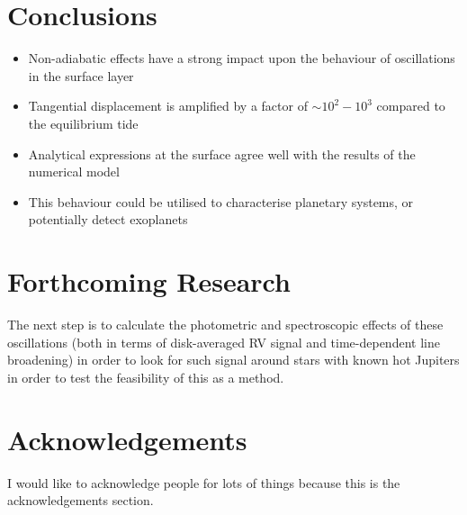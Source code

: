\documentclass[a0,portrait]{a0poster}
\begin{document}
\begin{multicols}{2}

\color{OrangeRed}

\section*{Conclusions}

\begin{itemize}
\item Non-adiabatic effects have a strong impact upon the behaviour of oscillations in the surface layer
\item Tangential displacement is amplified by a factor of $\sim 10^{2} - 10^{3}$ compared to the equilibrium tide
\item Analytical expressions at the surface agree well with the results of the numerical model
\item This behaviour could be utilised to characterise planetary systems, or potentially detect exoplanets
\end{itemize}

\color{DarkSlateGray} %


\section*{Forthcoming Research}

The next step is to calculate the photometric and spectroscopic effects of these oscillations (both in terms of disk-averaged RV signal and time-dependent line broadening) in order to look for such signal around stars with known hot Jupiters in order to test the feasibility of this as a method.

\small
\normalsize

\section*{Acknowledgements}

I would like to acknowledge people for lots of things because this is the acknowledgements section.


\end{multicols}
\end{document}
